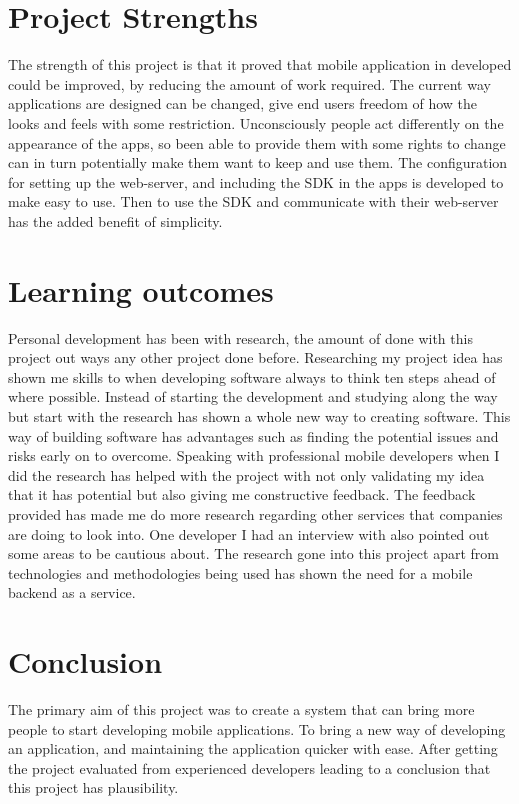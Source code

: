\section{Project Strengths}

The strength of this project is that it proved that mobile application in developed could be improved, by reducing the amount of work required. The current way applications are designed can be changed, give end users freedom of how the looks and feels with some restriction. Unconsciously people act differently on the appearance of the apps, so been able to provide them with some rights to change can in turn potentially make them want to keep and use them. The configuration for setting up the web-server, and including the SDK in the apps is developed to make easy to use. Then to use the SDK and communicate with their web-server has the added benefit of simplicity.

\section{Learning outcomes}


Personal development has been with research, the amount of done with this project out ways any other project done before. Researching my project idea has shown me skills to when developing software always to think ten steps ahead of where possible. Instead of starting the development and studying along the way but start with the research has shown a whole new way to creating software. This way of building software has advantages such as finding the potential issues and risks early on to overcome. Speaking with professional mobile developers when I did the research has helped with the project with not only validating my idea that it has potential but also giving me constructive feedback. The feedback provided has made me do more research regarding other services that companies are doing to look into. One developer I had an interview with also pointed out some areas to be cautious about. The research gone into this project apart from technologies and methodologies being used has shown the need for a mobile backend as a service.


\section{Conclusion}
The primary aim of this project was to create a system that can bring more people to start developing mobile applications. To bring a new way of developing an application, and maintaining the application quicker with ease. After getting the project evaluated from experienced developers leading to a conclusion that this project has plausibility.